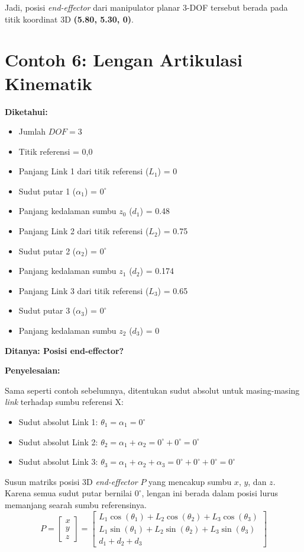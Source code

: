 \documentclass[12pt, a4paper, bahasa]{article}
\begin{document}
Jadi, posisi \textit{end-effector} dari manipulator planar 3-DOF tersebut berada pada titik koordinat 3D \textbf{(5.80, 5.30, 0)}.

\section*{Contoh 6: Lengan Artikulasi Kinematik}
\textbf{Diketahui:}
\begin{itemize}
    \item Jumlah $DOF = 3$
    \item Titik referensi = 0,0
    \item Panjang Link 1 dari titik referensi ($L_1$) = 0
    \item Sudut putar 1 ($\alpha_1$) = $0^\circ$
    \item Panjang kedalaman sumbu $z_0$ ($d_1$) = 0.48
    \item Panjang Link 2 dari titik referensi ($L_2$) = 0.75
    \item Sudut putar 2 ($\alpha_2$) = $0^\circ$
    \item Panjang kedalaman sumbu $z_1$ ($d_2$) = 0.174
    \item Panjang Link 3 dari titik referensi ($L_3$) = 0.65
    \item Sudut putar 3 ($\alpha_3$) = $0^\circ$
    \item Panjang kedalaman sumbu $z_2$ ($d_3$) = 0
\end{itemize}

\noindent \textbf{Ditanya: Posisi end-effector?}
\vspace{0.5cm}

\noindent \textbf{Penyelesaian:}

Sama seperti contoh sebelumnya, ditentukan sudut absolut untuk masing-masing \textit{link} terhadap sumbu referensi X:
\begin{itemize}
    \item Sudut absolut Link 1: $\theta_1 = \alpha_1 = 0^\circ$
    \item Sudut absolut Link 2: $\theta_2 = \alpha_1 + \alpha_2 = 0^\circ + 0^\circ = 0^\circ$
    \item Sudut absolut Link 3: $\theta_3 = \alpha_1 + \alpha_2 + \alpha_3 = 0^\circ + 0^\circ + 0^\circ = 0^\circ$
\end{itemize}

Susun matriks posisi 3D \textit{end-effector} $P$ yang mencakup sumbu $x$, $y$, dan $z$. Karena semua sudut putar bernilai $0^\circ$, lengan ini berada dalam posisi lurus memanjang searah sumbu referensinya.
\begin{equation}
P = \begin{bmatrix} x \\ y \\ z \end{bmatrix} = 
\begin{bmatrix} 
L_1 \cos(\theta_1) + L_2 \cos(\theta_2) + L_3 \cos(\theta_3) \\ 
L_1 \sin(\theta_1) + L_2 \sin(\theta_2) + L_3 \sin(\theta_3) \\
d_1 + d_2 + d_3
\end{bmatrix}
\end{equation}
\end{document}
